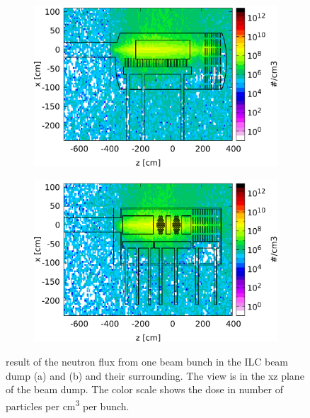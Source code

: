 \begin{figure}[!h]
 \centering
  \begin{subfigure}[b]{0.49\textwidth}
   \centering
    \includegraphics[width=\textwidth]{Figures/BeamDump/Neutron_flux_xz_Design1.png}
   \caption{\designone}
   \end{subfigure}
   \hfill
    \begin{subfigure}[b]{0.49\textwidth}
   \centering
    \includegraphics[width=\textwidth]{Figures/BeamDump/Neutron_flux_xz_Design2.png}
   \caption{\designtwo}
   \end{subfigure}
   \caption[Neutron flux in the ILC main beam dump]{\fluka result of the neutron flux from one beam bunch in the ILC beam dump \designone (a) and \designtwo (b) and their surrounding.
   The view is in the xz plane of the beam dump.
   The color scale shows the dose in number of particles per \si{\centi\meter\cubed} per bunch.}
   \label{fig:BeamDumps:Neutrons}
\end{figure} 

